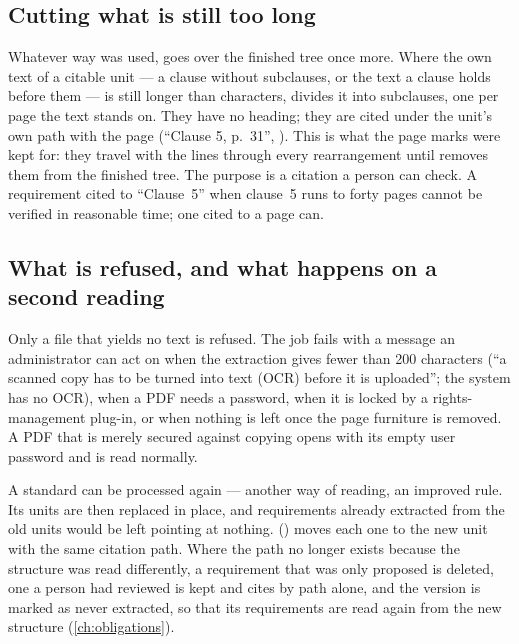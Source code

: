 \subsection{Cutting what is still too long}\label{sec:corpus:cut}

Whatever way was used,  goes over the finished tree once more. Where the
own text of a citable unit --- a clause without subclauses, or the text a clause holds before
them --- is still longer than  characters,  divides
it into subclauses, one per page the text stands on. They have no heading; they are cited
under the unit's own path with the page (\enquote{Clause 5, p.~31}, ).
This is what the page marks were kept for: they travel with the lines through every
rearrangement until  removes them from the finished tree. The purpose is a
citation a person can check. A requirement cited to \enquote{Clause~5} when clause~5 runs to
forty pages cannot be verified in reasonable time; one cited to a page can.

\subsection{What is refused, and what happens on a second reading}\label{sec:corpus:refused}

Only a file that yields no text is refused. The job fails with a message an administrator
can act on when the extraction gives fewer than 200 characters (\enquote{a scanned copy has
to be turned into text (OCR) before it is uploaded}; the system has no OCR), when a PDF needs
a password, when it is locked by a rights-management plug-in, or when nothing is left once the
page furniture is removed. A PDF that is merely secured against copying opens with its empty
user password and is read normally.

A standard can be processed again --- another way of reading, an improved rule. Its units are
then replaced in place, and requirements already extracted from the old units would be left
pointing at nothing.  () moves each one to
the new unit with the same citation path. Where the path no longer exists because the
structure was read differently, a requirement that was only proposed is deleted, one a person
had reviewed is kept and cites by path alone, and the version is marked as never extracted,
so that its requirements are read again from the new structure
(\cref{ch:obligations}).

